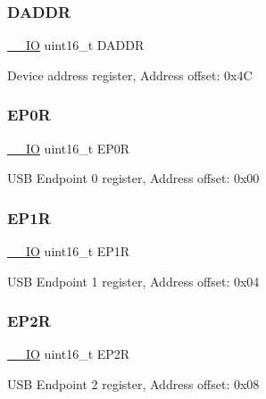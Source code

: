 \subsubsection{\texorpdfstring{D\+A\+D\+DR}{DADDR}}
{\footnotesize\ttfamily \hyperlink{core__sc300_8h_aec43007d9998a0a0e01faede4133d6be}{\+\_\+\+\_\+\+IO} uint16\+\_\+t D\+A\+D\+DR}

Device address register, Address offset\+: 0x4C \mbox{\label{struct_u_s_b___type_def_a325f0bdb1f81ce237dea2773bc26aed2}} 
\subsubsection{\texorpdfstring{E\+P0R}{EP0R}}
{\footnotesize\ttfamily \hyperlink{core__sc300_8h_aec43007d9998a0a0e01faede4133d6be}{\+\_\+\+\_\+\+IO} uint16\+\_\+t E\+P0R}

U\+SB Endpoint 0 register, Address offset\+: 0x00 \mbox{\label{struct_u_s_b___type_def_a181159566b312dd1471e247e6a74b8ef}} 
\subsubsection{\texorpdfstring{E\+P1R}{EP1R}}
{\footnotesize\ttfamily \hyperlink{core__sc300_8h_aec43007d9998a0a0e01faede4133d6be}{\+\_\+\+\_\+\+IO} uint16\+\_\+t E\+P1R}

U\+SB Endpoint 1 register, Address offset\+: 0x04 \mbox{\label{struct_u_s_b___type_def_aaf056ff97c76de78e90701449c8cbf16}} 
\subsubsection{\texorpdfstring{E\+P2R}{EP2R}}
{\footnotesize\ttfamily \hyperlink{core__sc300_8h_aec43007d9998a0a0e01faede4133d6be}{\+\_\+\+\_\+\+IO} uint16\+\_\+t E\+P2R}

U\+SB Endpoint 2 register, Address offset\+: 0x08 \mbox{\label{struct_u_s_b___type_def_ac4d0c88deada778ef870d2f6d478768f}} 
